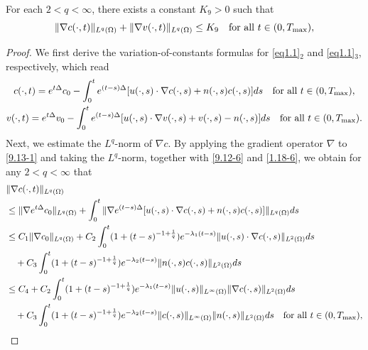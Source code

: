 \documentclass[reqno]{amsart}
\begin{document}
\begin{lemma}\label{lem3.8}
For each $ 2 <q <\infty$, there exists a constant $K_9>0$ such that
\begin{equation}\label{3.66}
\|\nabla c(\cdot, t)\|_{L^q(\Omega)} + \|\nabla v(\cdot, t)\|_{L^q(\Omega)} 
\leq K_9 \quad \text{for all } t \in (0, T_{\rm max}),
\end{equation}
\end{lemma}

\begin{proof} 
We first derive the variation-of-constants formulas for \eqref{eq1.1}$_2$ and 
\eqref{eq1.1}$_3$, respectively, which read
\begin{gather}\label{9.13-1}
c(\cdot, t) = e^{t\Delta} c_0- \int_{0}^t e^{(t - s)\Delta} 
[ u(\cdot, s) \cdot \nabla c(\cdot, s) + n(\cdot, s)c(\cdot, s) ] ds 
\quad \text{for all } t \in (0, T_{\rm max}), \\
\label{9.13-2}
v(\cdot, t) = e^{t\Delta} v_0 - \int_{0}^t e^{(t - s)\Delta} [ u(\cdot, s) 
\cdot \nabla v(\cdot, s) + v(\cdot, s) - n(\cdot, s) ] ds \quad \text{for all
} t \in (0, T_{\rm max}).
\end{gather}
Next, we estimate the $L^q$-norm of $\nabla c$. By applying the gradient operator 
$\nabla$ to \eqref{9.13-1} and taking the $L^q$-norm, together with \eqref{9.12-6} 
and \eqref{1.18-6}, we obtain  for any $2<q <\infty$ that
\begin{align*}
&\|\nabla c(\cdot, t)\|_{L^q(\Omega)} \\&\leq \| \nabla e^{t\Delta} 
 c_0 \|_{L^q(\Omega)} + \int_{0}^t \| \nabla e^{(t - s)\Delta} [ u(\cdot, s) \cdot
\nabla c(\cdot, s) + n(\cdot, s)c(\cdot, s) ] \|_{L^q(\Omega)} ds \\
&\leq C_1\| \nabla c_0\|_{L^q(\Omega)} + C_2 \int_{0}^t (1 + (t - s)^{-1 + \frac{1}{q}})
 e^{-\lambda_1(t - s)} \| u(\cdot, s) \cdot \nabla c(\cdot, s)
\|_{L^2(\Omega)} ds \\
&\quad + C_3 \int_0^t (1 + (t - s)^{-1 + \frac{1}{q}}) e^{-\lambda_2(t - s)} 
 \|  n(\cdot, s)c(\cdot, s)  \|_{L^2(\Omega)} ds\\
&\leq C_4 + C_2 \int_{0}^t (1 + (t - s)^{-1 + \frac{1}{q}}) e^{-\lambda_1(t - s)} 
\| u(\cdot, s) \|_{L^\infty(\Omega)} \|
\nabla c(\cdot, s) \|_{L^2(\Omega)} ds\\
&\quad + C_3 \int_{0}^t (1 + (t - s)^{-1 + \frac{1}{q}}) e^{-\lambda_2(t - s)} 
\| c(\cdot, s) \|_{L^\infty(\Omega)} \| n(\cdot, s) \|_{L^2(\Omega)} ds
\quad \text{for all } t \in (0, T_{\rm max}),
\end{align*}

\end{proof}
\end{document}
